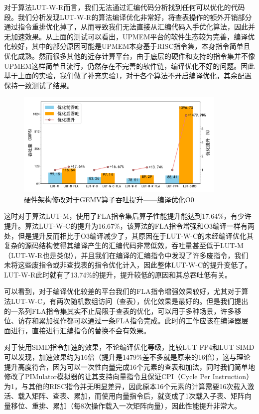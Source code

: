 对于算法LUT-W-R而言，我们无法通过汇编代码分析找到任何可以优化的代码段。我们分析发现LUT-W-R的算法编译优化非常好，将查表操作的额外开销部分通过指令重排优化掉了，从而导致我们无法直接从汇编代码入手优化算法，因此并无加速效果。从上面的测试可以看出，UPMEM平台的软件生态较为完善，编译优化较好，其中的部分原因可能是UPMEM本身基于RISC指令集，本身指令简单且优化成熟。然而很多其他的近存计算平台，由于底层的硬件和支持的指令集并不像UPMEM这样简单且流行，仍然存在不完善的软件链，编译优化不好的问题。因此基于上面的实验，我们做了补充实验\ref{EXP2-2}，对于各个算法不开启编译优化，其余配置保持一致测试了结果。

\begin{figure}[!htbp]
    \centering
    \includegraphics[width=0.9\textwidth]{figures/Exp2-2.pdf}
    \caption{硬件架构修改对于GEMV算子吞吐提升——编译优化O0}
	\label{EXP2-2}
\end{figure}

这时对于算法LUT-M，使用了FLA指令集后算子性能提升能达到17.64\%，有少许提升。算法LUT-W-C的提升为16.67\%，该算法的FLA指令增强和O3编译一样有两处，但是提升反而相比于O3编译减少了，其原因在于LUT-W-C的未经编译优化其复杂的源码结构使得其编译产生的汇编代码非常低效，吞吐量甚至低于LUT-M（LUT-W-R也是类似），并且我们在编译的汇编指令中发现了许多废指令，我们未将这些废指令或非查找表的指令优化计入，因此整体LUT-W-C的提升变低了。LUT-W-R此时就有了13.74\%的提升，提升较低的原因和其总吞吐低有关。

可以看到，对于编译优化较差的平台我们的FLA指令增强效果较好，尤其对于算法LUT-W-C，有两次随机数组访问（查表），优化效果是最好的。但是我们提出的一系列FLA指令集其实不止局限于查表的优化，可以用于多种场景，许多移位、访存和累加操作都可以通过一条FLA指令完成。此时的工作应该在编译器层面进行，直接进行汇编指令的替换不会有效果。

对于使用SIMD指令加速的效果，不论编译优化等级，比较LUT-FP4和LUT-SIMD可以发现，加速效果约为16倍（提升是1479\%差不多就是原来的16倍），这与理论提升高度符合，因为可以一次性向量完成16个元素的查表和加法，同时我们简单地修改了PIMulator模拟器的让其支持向量指令且保证CPI（Cycle Per Instruction）为1，与其他的RISC指令并无明显差异，因此原本16个元素的计算需要16次载入激活、载入矩阵、查表、累加，而使用向量指令后，就变成了1次载入子表、矩阵向量移位、重排、累加（每8次操作载入一次矩阵向量），因此性能提升非常大。


